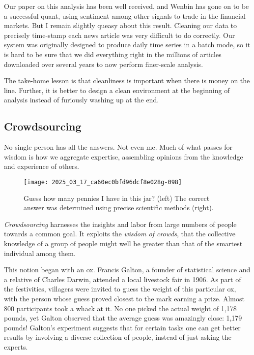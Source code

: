 \documentclass[10pt]{article}
\begin{document}
Our paper on this analysis \cite{ZS10} has been well received, and Wenbin has gone on to be a successful quant, using sentiment among other signals to trade in the financial markets. But I remain slightly queasy about this result. Cleaning our data to precisely time-stamp each news article was very difficult to do correctly. Our system was originally designed to produce daily time series in a batch mode, so it is hard to be sure that we did everything right in the millions of articles downloaded over several years to now perform finer-scale analysis.

The take-home lesson is that cleanliness is important when there is money on the line. Further, it is better to design a clean environment at the beginning of analysis instead of furiously washing up at the end.

\subsection{Crowdsourcing}

No single person has all the answers. Not even me. Much of what passes for wisdom is how we aggregate expertise, assembling opinions from the knowledge and experience of others.

\begin{figure}[h]
  \centering
  \texttt{[image: 2025\_03\_17\_ca60ec0bfd96dcf8e028g-098]}
  \caption{Guess how many pennies I have in this jar? (left) The correct answer was determined using precise scientific methods (right).}
  \label{fig:penny_jar}
\end{figure}

\textit{Crowdsourcing} harnesses the insights and labor from large numbers of people towards a common goal. It exploits the \textit{wisdom of crowds}, that the collective knowledge of a group of people might well be greater than that of the smartest individual among them.

This notion began with an ox. Francis Galton, a founder of statistical science and a relative of Charles Darwin, attended a local livestock fair in 1906. As part of the festivities, villagers were invited to guess the weight of this particular ox, with the person whose guess proved closest to the mark earning a prize. Almost 800 participants took a whack at it. No one picked the actual weight of 1,178 pounds, yet Galton observed that the average guess was amazingly close: 1,179 pounds! Galton's experiment suggests that for certain tasks one can get better results by involving a diverse collection of people, instead of just asking the experts.
\end{document}
